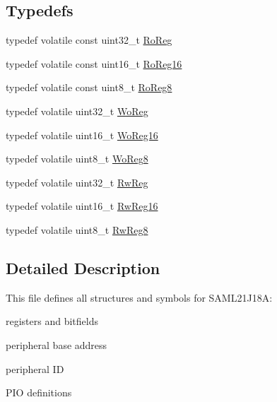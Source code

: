\subsection*{Typedefs}
\begin{DoxyCompactItemize}
\item 
typedef volatile const uint32\+\_\+t \hyperlink{group___s_a_m_l21_j18_a__definitions_ga5d556f8391af4141be23f7334ac9dd68}{Ro\+Reg}
\item 
typedef volatile const uint16\+\_\+t \hyperlink{group___s_a_m_l21_j18_a__definitions_gaebf6e33c2d49a802e06e22a95ea9d0d0}{Ro\+Reg16}
\item 
typedef volatile const uint8\+\_\+t \hyperlink{group___s_a_m_l21_j18_a__definitions_ga0d957f1433aaf5d70e4dc2b68288442d}{Ro\+Reg8}
\item 
typedef volatile uint32\+\_\+t \hyperlink{group___s_a_m_l21_j18_a__definitions_gac0f96d4e8018367b38f527007cf0eafd}{Wo\+Reg}
\item 
typedef volatile uint16\+\_\+t \hyperlink{group___s_a_m_l21_j18_a__definitions_ga0ab0e5f6c8301aa1c2068e511d854094}{Wo\+Reg16}
\item 
typedef volatile uint8\+\_\+t \hyperlink{group___s_a_m_l21_j18_a__definitions_ga5e336e5a36ee12ebeafb021108e5275b}{Wo\+Reg8}
\item 
typedef volatile uint32\+\_\+t \hyperlink{group___s_a_m_l21_j18_a__definitions_gacf1496e3bbe303e55f627fc7558a68c7}{Rw\+Reg}
\item 
typedef volatile uint16\+\_\+t \hyperlink{group___s_a_m_l21_j18_a__definitions_gacce07556c80fc352ae607f225f19fed5}{Rw\+Reg16}
\item 
typedef volatile uint8\+\_\+t \hyperlink{group___s_a_m_l21_j18_a__definitions_gae361754be775bb192f85821d3ab33c17}{Rw\+Reg8}
\end{DoxyCompactItemize}


\subsection{Detailed Description}
This file defines all structures and symbols for S\+A\+M\+L21\+J18\+A\+:
\begin{DoxyItemize}
\item registers and bitfields
\item peripheral base address
\item peripheral I\+D
\item P\+I\+O definitions 
\end{DoxyItemize}

